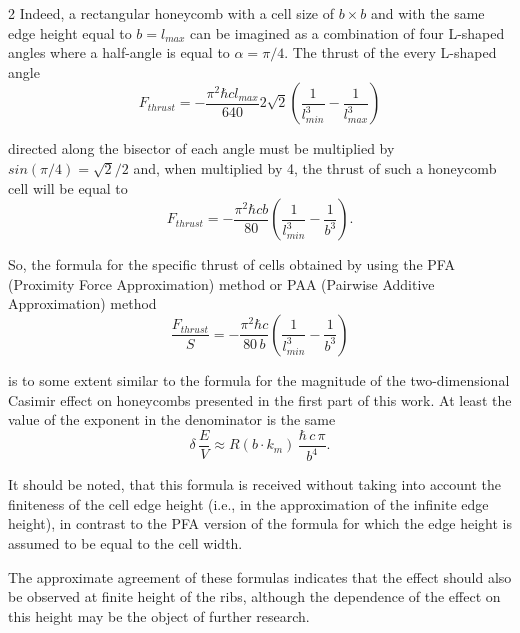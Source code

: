 \documentclass[twoside, 10pt]{article}
\begin{document}
\begin{multicols}{2}
Indeed, a rectangular honeycomb with a cell size of \(b \times b\) and
with the same edge height equal to \(b = l_{max}\) can be imagined as a
combination of four \mbox{L-shaped} angles where a half-angle is equal to
\(\alpha = {\pi}/{4}\). The thrust of the every \mbox{L-shaped} angle
\noindent
\begin{equation}F_{thrust} = - \frac{\pi^2\hbar c l_{max}}{640} 2\sqrt{2} \left(\frac{1}{l_{min}^3} - \frac{1}{l_{max}^3}\right)\end{equation}

directed along the bisector of each angle must be multiplied by
\(sin\left({\pi}/{4}\right)={\sqrt{2}}\big/{2}\) and, when multiplied by
4, the thrust of such a honeycomb cell will be equal to
\noindent
\begin{equation}F_{thrust} = - \frac{\pi^2\hbar c b}{80} \left(\frac{1}{l_{min}^3} - \frac{1}{b^3}\right).\end{equation}

So, the formula for the specific thrust of cells obtained by using the PFA
(Proximity Force Approximation) method or PAA (Pairwise Additive
Approximation) method
\noindent
\begin{equation}\frac{F_{thrust}}{S} = - \frac{\pi^2\hbar c}{80\, b} \left(\frac{1}{l_{min}^3} - \frac{1}{b^3}\right)\end{equation}

is to some extent similar to the formula for the magnitude of the
two-dimensional Casimir effect on honeycombs presented in the first part
of this work. At least the value of the exponent in the denominator is
the same
\noindent
\begin{equation}\delta\,\frac{E}{V} \approx R\left(b \cdot k_m\right)\,\frac{\hbar\,c\,\pi}{b^4}.\end{equation}

It should be noted, that this formula is received without taking
into account the finiteness of the cell edge height (i.e., in
the approximation of the infinite edge height), in contrast to the PFA
version of the formula for which the edge height is assumed to be equal
to the cell width.

The approximate agreement of these formulas indicates that the
effect should also be observed at finite height of the ribs, although
the dependence of the effect on this height may be the object of further
research.


\end{multicols}
\end{document}
